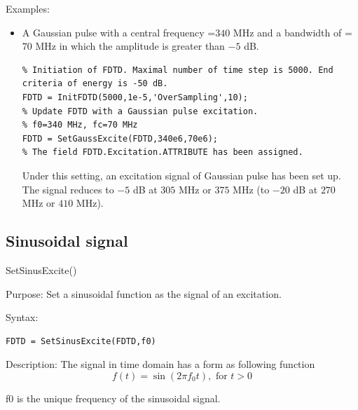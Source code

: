 \begin{FontDescr}{Examples:}
 \begin{itemize}
\item A Gaussian pulse with a central frequency =$340$ MHz and a bandwidth of =$70$ MHz in which the amplitude is greater than $-5$ dB.
\begin{lstlisting}
% Initiation of FDTD. Maximal number of time step is 5000. End criteria of energy is -50 dB.
FDTD = InitFDTD(5000,1e-5,'OverSampling',10);
% Update FDTD with a Gaussian pulse excitation.
% f0=340 MHz, fc=70 MHz
FDTD = SetGaussExcite(FDTD,340e6,70e6);
% The field FDTD.Excitation.ATTRIBUTE has been assigned.
\end{lstlisting}
Under this setting, an excitation signal of Gaussian pulse has been set up. The signal reduces to $-5$ dB at $305$ MHz or $375$ MHz (to $-20$ dB at $270$ MHz or $410$ MHz).
\end{itemize}
\end{FontDescr}

    \subsection{Sinusoidal signal}\label{subsec:Sinusoidal signal}
\begin{FontNameFunct}{SetSinusExcite()}
 \label{func:SetSinusExcite}
\end{FontNameFunct}

\begin{FontDescr}{Purpose:}
 Set a sinusoidal function as the signal of an excitation.
\end{FontDescr}

\begin{FontDescr}{Syntax:}
      \begin{lstlisting}
FDTD = SetSinusExcite(FDTD,f0)
      \end{lstlisting}
\end{FontDescr}

\begin{FontDescr}{Description:}
       The signal in time domain has a form as following function\\
\begin{equation}\label{equ:SinusoidalSignal_time}
 f(t)=\sin{(2\pi f_0t)}, \text{ for } t>0
\end{equation}
    \begin{FontPara}{f0}  \label{para:sinf0}
    is the unique frequency of the sinusoidal signal.
    \end{FontPara}
\end{FontDescr}

